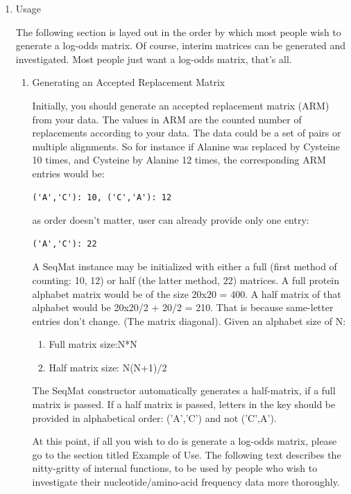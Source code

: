 \documentclass{report}
\begin{document}
\begin{enumerate}
\begin{enumerate}
  \end{enumerate}

\item Usage

   The following section is layed out in the order by which most people wish to generate a log-odds matrix. Of course, interim matrices can be generated and
   investigated. Most people just want a log-odds matrix, that's all.
  
   \begin{enumerate}

   \item Generating an Accepted Replacement Matrix

   Initially, you should generate an accepted replacement matrix (ARM) from your data. The values in ARM are the counted number of replacements according to your data. The data could be a set of pairs or multiple alignments. So for instance if Alanine was replaced by Cysteine 10 times, and Cysteine by Alanine 12 times, the corresponding ARM entries would be:

\begin{verbatim}
('A','C'): 10, ('C','A'): 12
\end{verbatim}

as order doesn't matter, user can already provide only one entry:

\begin{verbatim}
('A','C'): 22
\end{verbatim}

 A SeqMat instance may be initialized with either a full (first method of counting: 10, 12) or half (the latter method, 22) matrices. A full protein
   alphabet matrix would be of the size 20x20 = 400. A half matrix of that alphabet would be 20x20/2 + 20/2 = 210. That is because same-letter entries don't
   change. (The matrix diagonal). Given an alphabet size of N:

   \begin{enumerate}
     \item Full matrix size:N*N

     \item Half matrix size: N(N+1)/2
   \end{enumerate}

The SeqMat constructor automatically generates a half-matrix, if a full matrix is passed. If a half matrix is passed, letters in the key should be provided in alphabetical order: ('A','C') and not ('C',A').

At this point, if all you wish to do is generate a log-odds matrix, please go to the section titled Example of Use. The following text describes the nitty-gritty of internal functions, to be used by people who wish to investigate their nucleotide/amino-acid frequency data more thoroughly.


\end{enumerate}
\end{enumerate}
\end{document}
